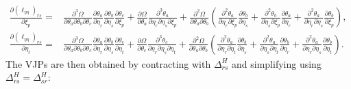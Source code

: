 \documentclass{article}
\begin{document}
\begin{align}
  \tfrac{\partial (\ell_{\eta\eta})_{rs}}{\partial \xi_p}
  = & \tfrac{\partial^3 \Omega}{\partial \theta_a \partial \theta_b \partial \theta_c}
  \tfrac{\partial \theta_a}{\partial \eta_r} \tfrac{\partial \theta_b}{\partial \eta_s} \tfrac{\partial \theta_c}{\partial \xi_p}
  + \tfrac{\partial \Omega}{\partial \theta_a}
  \tfrac{\partial^3 \theta_a}{\partial \eta_r \partial \eta_s \partial \xi_p} + \tfrac{\partial^2 \Omega}{\partial \theta_a \partial \theta_b}
  \left(
  \tfrac{\partial^2 \theta_a}{\partial \eta_r \partial \xi_p} \tfrac{\partial \theta_b}{\partial \eta_s}
  + \tfrac{\partial^2 \theta_b}{\partial \eta_s \partial \xi_p} \tfrac{\partial \theta_a}{\partial \eta_r}
  + \tfrac{\partial^2 \theta_a}{\partial \eta_r \partial \eta_s} \tfrac{\partial \theta_b}{\partial \xi_p}
  \right),                                                                             \\
  \tfrac{\partial (\ell_{\eta\eta})_{rs}}{\partial \eta_t}
  = & \tfrac{\partial^3 \Omega}{\partial \theta_a \partial \theta_b \partial \theta_c}
  \tfrac{\partial \theta_a}{\partial \eta_r} \tfrac{\partial \theta_b}{\partial \eta_s} \tfrac{\partial \theta_c}{\partial \eta_t}
  + \tfrac{\partial \Omega}{\partial \theta_c}
  \tfrac{\partial^3 \theta_c}{\partial \eta_r \partial \eta_s \partial \eta_t} + \tfrac{\partial^2 \Omega}{\partial \theta_a \partial \theta_b}
  \left(
  \tfrac{\partial^2 \theta_a}{\partial \eta_r \partial \eta_t} \tfrac{\partial \theta_b}{\partial \eta_s}
  + \tfrac{\partial^2 \theta_a}{\partial \eta_s \partial \eta_t} \tfrac{\partial \theta_b}{\partial \eta_r}
  + \tfrac{\partial^2 \theta_a}{\partial \eta_r \partial \eta_s} \tfrac{\partial \theta_b}{\partial \eta_t}
  \right).
\end{align}
%
The VJPs are then obtained by contracting with $\Delta^H_{rs}$ and simplifying using $\Delta^H_{rs} = \Delta^H_{sr}$:
%
\end{document}
